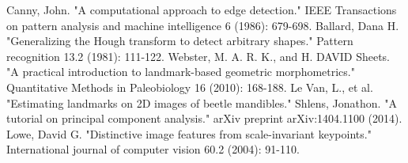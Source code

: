 \documentclass[twoside,twocolumn,10pt]{article}
\begin{document}

\begin{thebibliography}{99}
\label{references}
 Canny, John. "A computational approach to edge detection." IEEE Transactions on pattern analysis and machine intelligence 6 (1986): 679-698.
 Ballard, Dana H. "Generalizing the Hough transform to detect arbitrary shapes." Pattern recognition 13.2 (1981): 111-122.
 Webster, M. A. R. K., and H. DAVID Sheets. "A practical introduction to landmark-based geometric morphometrics." Quantitative Methods in Paleobiology 16 (2010): 168-188.
 Le Van, L., et al. "Estimating landmarks on 2D images of beetle mandibles."
 Shlens, Jonathon. "A tutorial on principal component analysis." arXiv preprint arXiv:1404.1100 (2014).
 Lowe, David G. "Distinctive image features from scale-invariant keypoints." International journal of computer vision 60.2 (2004): 91-110.
\end{thebibliography}


\end{document}
